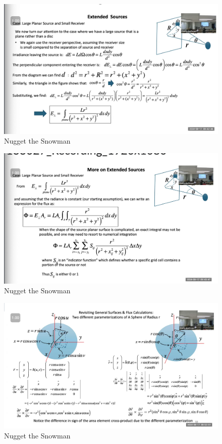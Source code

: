 \documentclass{article}
\begin{document}
\begin{figure}[h!]
\centering
\includegraphics[scale=.6]{Radiometry/Week4/Notes/Sept17/Plane.png}
\caption{Nugget the Snowman}
\label{fig:Plane}
\end{figure}


\begin{figure}[h!]
\centering
\includegraphics[scale=.6]{Radiometry/Week4/Notes/Sept17/Plane2.png}
\caption{Nugget the Snowman}
\label{fig:Plane2}
\end{figure}

\begin{figure}[h!]
\centering
\includegraphics[scale=.6]{Radiometry/Week4/Notes/Sept17/Spherical.png}
\caption{Nugget the Snowman}
\label{fig:Spherical}
\end{figure}
\end{document}
